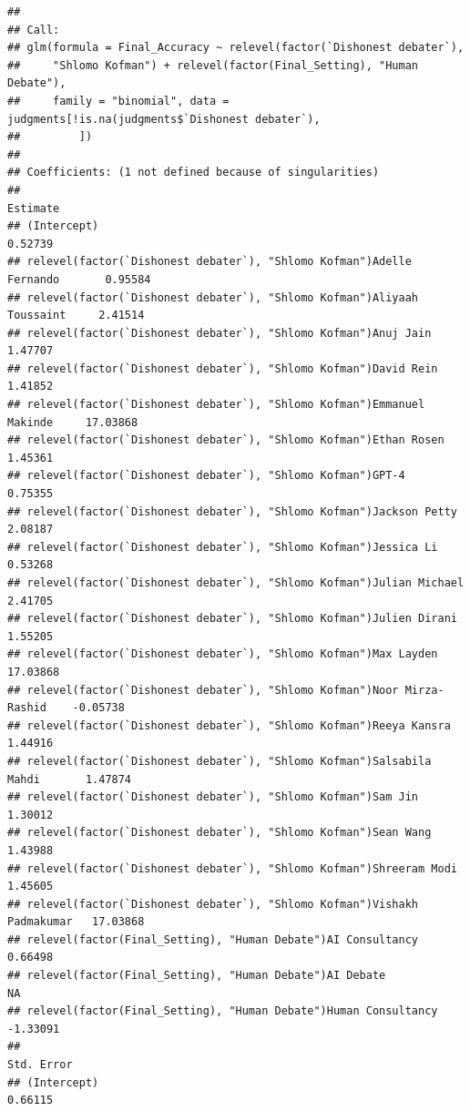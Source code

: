 \documentclass[
]{article}
\begin{document}
\begin{verbatim}
## 
## Call:
## glm(formula = Final_Accuracy ~ relevel(factor(`Dishonest debater`), 
##     "Shlomo Kofman") + relevel(factor(Final_Setting), "Human Debate"), 
##     family = "binomial", data = judgments[!is.na(judgments$`Dishonest debater`), 
##         ])
## 
## Coefficients: (1 not defined because of singularities)
##                                                                           Estimate
## (Intercept)                                                                0.52739
## relevel(factor(`Dishonest debater`), "Shlomo Kofman")Adelle Fernando       0.95584
## relevel(factor(`Dishonest debater`), "Shlomo Kofman")Aliyaah Toussaint     2.41514
## relevel(factor(`Dishonest debater`), "Shlomo Kofman")Anuj Jain             1.47707
## relevel(factor(`Dishonest debater`), "Shlomo Kofman")David Rein            1.41852
## relevel(factor(`Dishonest debater`), "Shlomo Kofman")Emmanuel Makinde     17.03868
## relevel(factor(`Dishonest debater`), "Shlomo Kofman")Ethan Rosen           1.45361
## relevel(factor(`Dishonest debater`), "Shlomo Kofman")GPT-4                 0.75355
## relevel(factor(`Dishonest debater`), "Shlomo Kofman")Jackson Petty         2.08187
## relevel(factor(`Dishonest debater`), "Shlomo Kofman")Jessica Li            0.53268
## relevel(factor(`Dishonest debater`), "Shlomo Kofman")Julian Michael        2.41705
## relevel(factor(`Dishonest debater`), "Shlomo Kofman")Julien Dirani         1.55205
## relevel(factor(`Dishonest debater`), "Shlomo Kofman")Max Layden           17.03868
## relevel(factor(`Dishonest debater`), "Shlomo Kofman")Noor Mirza-Rashid    -0.05738
## relevel(factor(`Dishonest debater`), "Shlomo Kofman")Reeya Kansra          1.44916
## relevel(factor(`Dishonest debater`), "Shlomo Kofman")Salsabila Mahdi       1.47874
## relevel(factor(`Dishonest debater`), "Shlomo Kofman")Sam Jin               1.30012
## relevel(factor(`Dishonest debater`), "Shlomo Kofman")Sean Wang             1.43988
## relevel(factor(`Dishonest debater`), "Shlomo Kofman")Shreeram Modi         1.45605
## relevel(factor(`Dishonest debater`), "Shlomo Kofman")Vishakh Padmakumar   17.03868
## relevel(factor(Final_Setting), "Human Debate")AI Consultancy               0.66498
## relevel(factor(Final_Setting), "Human Debate")AI Debate                         NA
## relevel(factor(Final_Setting), "Human Debate")Human Consultancy           -1.33091
##                                                                         Std. Error
## (Intercept)                                                                0.66115

\end{verbatim}
\end{document}
